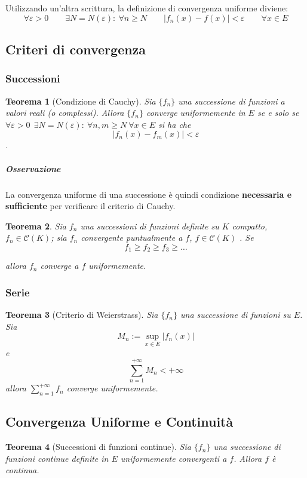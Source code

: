 \documentclass[a4paper,12pt]{article}
\newcommand{\cont}{\mathscr{C}}
\newtheorem{teo}{Teorema}
\begin{document}
Utilizzando un'altra scrittura, la definizione di convergenza uniforme diviene:
 $$\forall \varepsilon>0\qquad \exists N=N(\varepsilon):\ \forall n \geq N\qquad |f_n(x) - f(x)| < \varepsilon\qquad \forall x\in E$$ 

\subsection{Criteri di convergenza}

\subsubsection{Successioni}
\begin{teo}[Condizione di Cauchy]
Sia $\{f_n\}$ una successione di funzioni a valori reali (o complessi). Allora $\{f_n\}$ converge uniformemente in $E$ se e solo se $\forall \varepsilon>0\ \ \exists N=N(\varepsilon):\ \forall n,m \geq N\ \forall x\in E$ si ha che 
$$|f_n(x) - f_m(x)| < \varepsilon$$.
\end{teo}
\subparagraph*{Osservazione}
La convergenza uniforme di una successione è quindi condizione \textbf{necessaria e sufficiente} per verificare il criterio di Cauchy.
\begin{teo}
Sia ${f_n}$ una successioni di funzioni definite su $K$ compatto, $f_n \in \cont(K)$; sia $f_n$ convergente puntualmente a $f$,   $f \in \cont(K)$ . Se
\begin{displaymath}
f_1 \geq f_2 \geq f_3 \geq \dots
\end{displaymath}

allora $f_n$ converge a $f$ uniformemente.
\end{teo}
\subsubsection{Serie}

\begin{teo}[Criterio di Weierstrass]
Sia $\{f_n\}$ una successione di funzioni su $E$. Sia $$M_n:= \displaystyle\sup_{x\in E}|f_n(x)|$$ e $$\sum_{n=1}^{+\infty}M_n<+\infty$$
allora $\displaystyle\sum_{n=1}^{+\infty}f_n$ converge uniformemente.
\end{teo}
\subsection{Convergenza Uniforme e Continuità}
\begin{teo}[Successioni di funzioni continue]
Sia $\{f_n\}$ una successione di funzioni continue definite in $E$ uniformemente convergenti a $f$. Allora $f$ è continua.
\end{teo}
\end{document}
